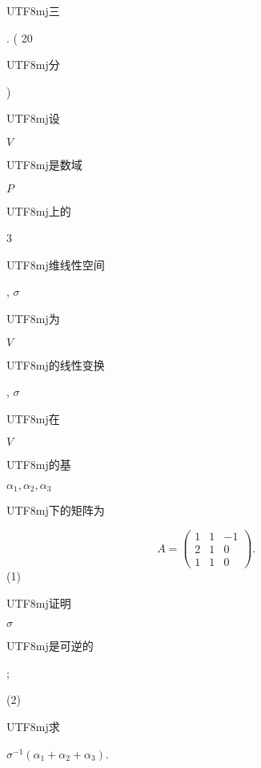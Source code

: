 \documentclass[10pt]{article}
\begin{document}
\begin{CJK}{UTF8}{mj}三\end{CJK}. ( 20 \begin{CJK}{UTF8}{mj}分\end{CJK}) \begin{CJK}{UTF8}{mj}设\end{CJK} $V$ \begin{CJK}{UTF8}{mj}是数域\end{CJK} $P$ \begin{CJK}{UTF8}{mj}上的\end{CJK} 3 \begin{CJK}{UTF8}{mj}维线性空间\end{CJK}, $\sigma$ \begin{CJK}{UTF8}{mj}为\end{CJK} $V$ \begin{CJK}{UTF8}{mj}的线性变换\end{CJK}, $\sigma$ \begin{CJK}{UTF8}{mj}在\end{CJK} $V$ \begin{CJK}{UTF8}{mj}的基\end{CJK} $\alpha_{1}, \alpha_{2}, \alpha_{3}$ \begin{CJK}{UTF8}{mj}下的矩阵为\end{CJK}
$$
A=\left(\begin{array}{ccc}
1 & 1 & -1 \\
2 & 1 & 0 \\
1 & 1 & 0
\end{array}\right) \text {. }
$$
(1) \begin{CJK}{UTF8}{mj}证明\end{CJK} $\sigma$ \begin{CJK}{UTF8}{mj}是可逆的\end{CJK};

(2) \begin{CJK}{UTF8}{mj}求\end{CJK} $\sigma^{-1}\left(\alpha_{1}+\alpha_{2}+\alpha_{3}\right)$.
\end{document}
